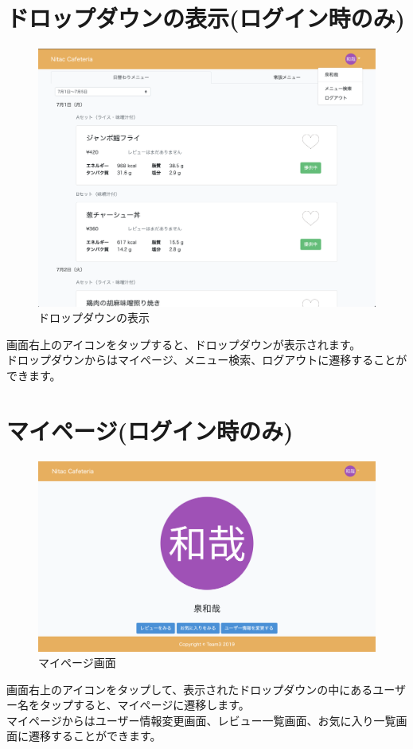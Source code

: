 \documentclass[a4paper]{jsarticle}
\begin{document}
	\section{ドロップダウンの表示(ログイン時のみ)}
\begin{figure}[htbp]
	\centering
	\caption{ドロップダウンの表示}
	\includegraphics[scale = 0.22525]{image/dropdown_student.png}
\end{figure}
画面右上のアイコンをタップすると、ドロップダウンが表示されます。\\
ドロップダウンからはマイページ、メニュー検索、ログアウトに遷移することができます。
\section{マイページ(ログイン時のみ)}
\begin{figure}[htbp]
\centering
	\caption{マイページ画面}
	\includegraphics[scale = 0.225]{image/mypage.png}
\end{figure}
画面右上のアイコンをタップして、表示されたドロップダウンの中にあるユーザー名をタップすると、マイページに遷移します。\\
マイページからはユーザー情報変更画面、レビュー一覧画面、お気に入り一覧画面に遷移することができます。
\end{document}

